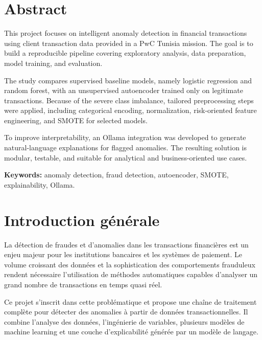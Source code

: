 \documentclass[12pt,a4paper,twoside]{report}
\begin{document}
\chapter*{Abstract}

This project focuses on intelligent anomaly detection in financial transactions using client transaction data provided in a PwC Tunisia mission. The goal is to build a reproducible pipeline covering exploratory analysis, data preparation, model training, and evaluation.

The study compares supervised baseline models, namely logistic regression and random forest, with an unsupervised autoencoder trained only on legitimate transactions. Because of the severe class imbalance, tailored preprocessing steps were applied, including categorical encoding, normalization, risk-oriented feature engineering, and SMOTE for selected models.

To improve interpretability, an Ollama integration was developed to generate natural-language explanations for flagged anomalies. The resulting solution is modular, testable, and suitable for analytical and business-oriented use cases.

\textbf{Keywords:} anomaly detection, fraud detection, autoencoder, SMOTE, explainability, Ollama.

\newpage

\tableofcontents
\newpage


\chapter*{Introduction générale}

La détection de fraudes et d'anomalies dans les transactions financières est un enjeu majeur pour les institutions bancaires et les systèmes de paiement. Le volume croissant des données et la sophistication des comportements frauduleux rendent nécessaire l'utilisation de méthodes automatiques capables d'analyser un grand nombre de transactions en temps quasi réel.

Ce projet s'inscrit dans cette problématique et propose une chaîne de traitement complète pour détecter des anomalies à partir de données transactionnelles. Il combine l'analyse des données, l'ingénierie de variables, plusieurs modèles de machine learning et une couche d'explicabilité générée par un modèle de langage.
\end{document}
